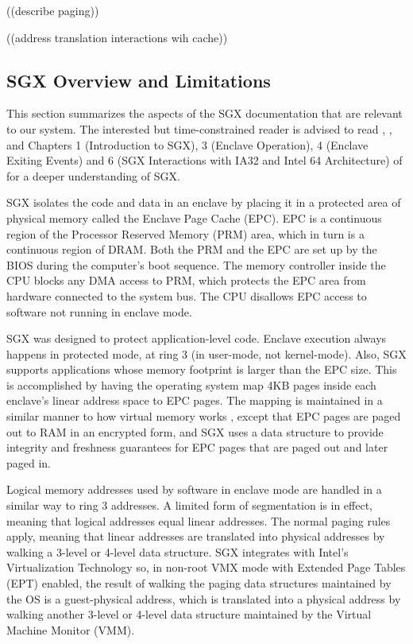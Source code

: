 ((describe paging))

((address translation interactions wih cache))


\subsection{SGX Overview and Limitations}

This section summarizes the aspects of the SGX documentation that are relevant
to our system. The interested but time-constrained reader is advised to read
\cite{mckeen2013innovative}, \cite{anati2013sgx}, and Chapters 1 (Introduction
to SGX), 3 (Enclave Operation), 4 (Enclave Exiting Events) and 6 (SGX
Interactions with IA32 and Intel 64 Architecture) of \cite{intel2013sgxmanual}
for a deeper understanding of SGX.

SGX isolates the code and data in an enclave by placing it in a protected area
of physical memory called the Enclave Page Cache (EPC). EPC is a continuous
region of the Processor Reserved Memory (PRM) area, which in turn is a
continuous region of DRAM. Both the PRM and the EPC are set up by the BIOS
during the computer's boot sequence. The memory controller inside the CPU
blocks any DMA access to PRM, which protects the EPC area from hardware
connected to the system bus. The CPU disallows EPC access to software not
running in enclave mode.

SGX was designed to protect application-level code. Enclave execution always
happens in protected mode, at ring 3 (in user-mode, not kernel-mode). Also, SGX
supports applications whose memory footprint is larger than the EPC size. This
is accomplished by having the operating system map 4KB pages inside each
enclave's linear address space to EPC pages. The mapping is maintained in a
similar manner to how virtual memory works \cite{jacob1998virtual}, except that
EPC pages are paged out to RAM in an encrypted form, and SGX uses a data
structure to provide integrity and freshness guarantees for EPC pages that are
paged out and later paged in.

Logical memory addresses used by software in enclave mode are handled in a
similar way to ring 3 addresses. A limited form of segmentation is in effect,
meaning that logical addresses equal linear addresses. The normal paging rules
apply, meaning that linear addresses are translated into physical addresses
by walking a 3-level or 4-level data structure. SGX integrates with Intel's
Virtualization Technology \cite{uhlig2005intel} so, in non-root VMX mode with
Extended Page Tables (EPT) enabled, the result of walking the paging data
structures maintained by the OS is a guest-physical address, which is
translated into a physical address by walking another 3-level or 4-level
data structure maintained by the Virtual Machine Monitor (VMM).

